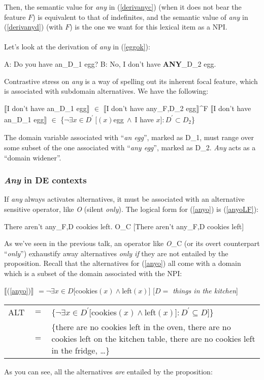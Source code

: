 \documentclass[a4paper,11pt]{article}
\newcommand{\reff}[1]{(\ref{#1})}
\newcommand{\eval}[2][]{$\llbracket$#2$\rrbracket_{#1}$}
\newcommand{\exs}[2][]{\begin{exe}\ex #1 \begin{xlist}#2\end{xlist}\end{exe}}
\begin{document}
Then, the semantic value for \emph{any} in \reff{derivanyc} (when it does not bear the feature $F$) is equivalent to that of indefinites, and the semantic value of \emph{any} in \reff{derivanyd} (with $F$) is the one we want for this lexical item as a NPI.

\paragraph{}
Let's look at the derivation of \emph{any} in \reff{eggok}:
\exs[\label{eggok}]{
	\ex A: Do you have an_{D_1} egg?
	\ex B: No, I don't have \textbf{ANY}_{D_2} egg.
}
%
Contrastive stress on \emph{any} is a way of spelling out its inherent focal feature, which is associated with subdomain alternatives. We have the following:

\exs[\label{eggokvalsem}]{
	\ex \eval{I don't have an_{D_1} egg} $\in$ \eval{I don't have any_{F,D_2} egg}^F
	\ex \eval{I don't have an_{D_1} egg} $\in$ \{$\neg \exists{x \in D^{\prime}}~[(x)$egg$~\wedge~$I have $x]: D^{\prime} \subset D_2$\} 
}
%
The domain variable associated with \enquote{\emph{an egg}}, marked as D_1, must range over some subset of the one associated with \enquote{\emph{any egg}}, marked as D_2. \emph{Any} acts as a \enquote{domain widener}.

\subsubsection{\emph{Any} in DE contexts}
If \emph{any} always activates alternatives, it must be associated with an alternative sensitive operator, like \emph{O} (silent \emph{only}). The logical form for \reff{anyo} is \reff{anyoLF}:

\exs{
	\ex\label{anyo} There aren't any_{F,D} cookies left.
	\ex\label{anyoLF} O_C [There aren't any_{F,D} cookies left]
}
%
As we've seen in the previous talk, an operator like \emph{O}_C (or its overt counterpart \enquote{\emph{only}}) exhaustify away alternatives \emph{only if} they are not entailed by the proposition. Recall that the alternatives for \reff{anyo} all come with a domain which is a subset of the domain associated with the NPI:

\exs[]{
  \ex\label{anyovalsem} \eval{\reff{anyo}} $= \neg\exists{x \in D}[$cookies$(x) \wedge $left$(x)]$ \hfill [\emph{$D =$ things in the kitchen}]
  \ex \begin{tabular}[t]{llp{12cm}}\toprule[-12.5pt]
  		ALT & $=$ & $\{\neg\exists{x \in D^\prime}[$cookies$(x) \wedge $left$(x)]: D^\prime \subseteq D]$\}\\
  		    & $=$ & \{there are no cookies left in the oven, there are no cookies left on the kitchen table, there are no cookies left in the fridge, \ldots{}\}
  \end{tabular}  
}
%
As you can see, all the alternatives \emph{are} entailed by the proposition:
\end{document}
